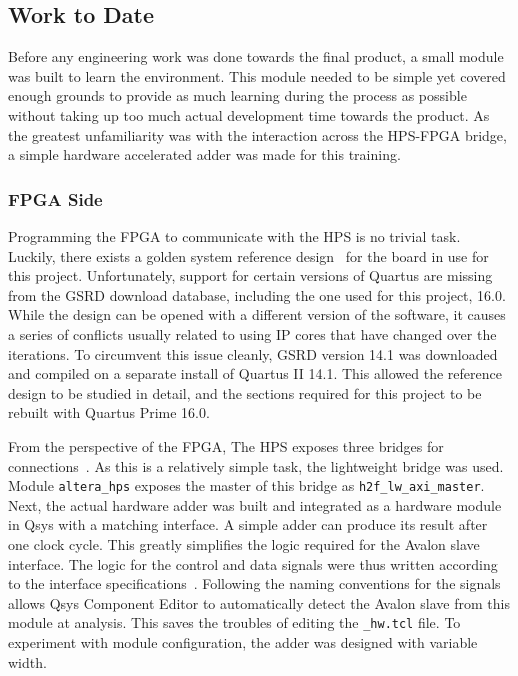 \subsection{Work to Date}

Before any engineering work was done towards the final product, a small module
was built to learn the environment.
This module needed to be simple yet covered enough grounds to provide as much
learning during the process as possible without taking up too much actual
development time towards the product.
As the greatest unfamiliarity was with the interaction across the HPS-FPGA
bridge, a simple hardware accelerated adder was made for this training.

\subsubsection{\textbf{FPGA Side}}
Programming the FPGA to communicate with the HPS is no trivial task.
Luckily, there exists a golden system reference design~\cite{Rocket1} for
the board in use for this project.
Unfortunately, support for certain versions of Quartus are missing from
the GSRD download database, including the one used for this project, 16.0.
While the design can be opened with a different version of the software,
it causes a series of conflicts usually related to using IP cores that
have changed over the iterations.
To circumvent this issue cleanly, GSRD version 14.1 was downloaded and compiled
on a separate install of Quartus II 14.1.
This allowed the reference design to be studied in detail, and the sections
required for this project to be rebuilt with Quartus Prime 16.0.

From the perspective of the FPGA, The HPS exposes three bridges for
connections~\cite{Altera6}.
As this is a relatively simple task, the lightweight bridge was used.
Module \texttt{altera\_hps} exposes the master of this bridge as
\texttt{h2f\_lw\_axi\_master}.
Next, the actual hardware adder was built and integrated as a hardware
module in Qsys with a matching interface.
A simple adder can produce its result after one clock cycle.
This greatly simplifies the logic required for the Avalon slave interface.
The logic for the control and data signals were thus written according to the
interface specifications~\cite{Intel3}.
Following the naming conventions for the signals allows Qsys Component Editor
to automatically detect the Avalon slave from this module at analysis.
This saves the troubles of editing the \texttt{\_hw.tcl} file.
To experiment with module configuration, the adder was designed with variable
width.

